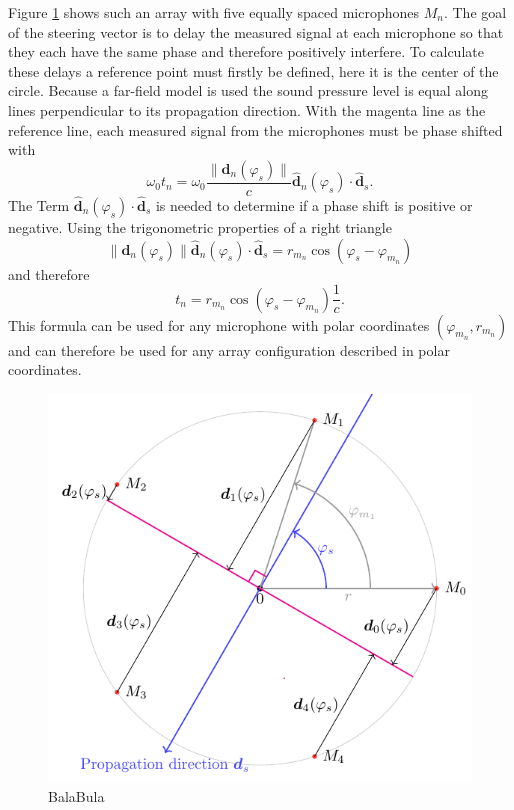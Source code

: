 Figure \ref*{ssl:fig:steering} shows such an array with five equally spaced microphones $M_n$.
The goal of the steering vector is to delay the measured signal at each microphone so that
they each have the same phase and therefore positively interfere.
To calculate these delays a reference point must firstly be defined, here it is the center of the circle.
Because a far-field model is used the sound pressure level is equal along lines perpendicular
to its propagation direction.
With the magenta line as the reference line, each measured signal from the microphones must be
phase shifted with 
\begin{equation}
  \omega_0 t_n = 
  \omega_0 \frac{
    \lVert\bm{d}_n(\varphi_s)\rVert}
    {c} 
    \hat{\bm{d}}_n(\varphi_s) \cdot \hat{\bm{d}}_s.
\end{equation}
The Term $\hat{\bm{d}}_n(\varphi_s) \cdot \hat{\bm{d}}_s$ is needed to determine
if a phase shift is positive or negative.
Using the trigonometric properties of a right triangle
\begin{equation}
  \lVert\bm{d}_n(\varphi_s)\rVert \hat{\bm{d}}_n(\varphi_s) \cdot \hat{\bm{d}}_s = r_{m_n} \cos(\varphi_s - \varphi_{m_n})
\end{equation}
and therefore
\begin{equation}
  t_n = 
  r_{m_n} \cos(\varphi_s - \varphi_{m_n})
  \frac{1}{c}.
  \label{ssl:eq:beamr2}
\end{equation}
This formula can be used for any microphone with polar coordinates
$(\varphi_{m_n}, r_{m_n})$ and can therefore be used for any array configuration
described in polar coordinates.
\begin{figure}
  \centering
  \includegraphics[]{steering_vector.pdf}
  \caption{BalaBula}
  \label{ssl:fig:steering}
\end{figure}

